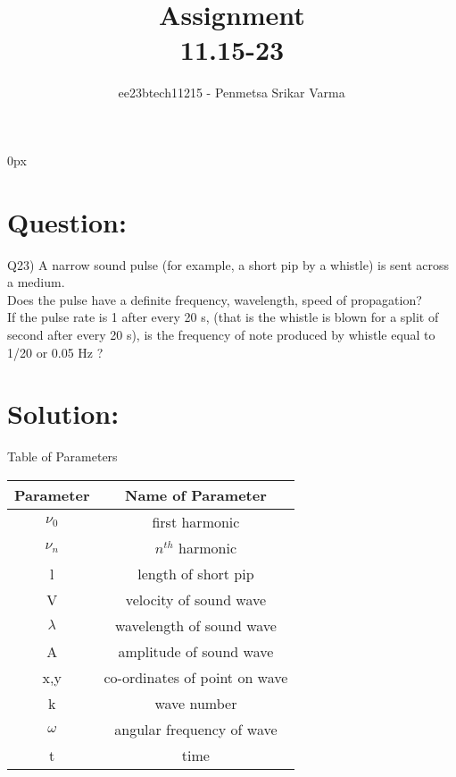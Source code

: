 \documentclass[beamer]{IEEEtran}
\theoremstyle{remark}
\begin{document}
\parindent 0px


\title{Assignment\\[1ex]11.15-23}
\author{ee23btech11215 - Penmetsa Srikar Varma$^{}$%
}
\maketitle
\newpage
\bigskip

\renewcommand{\thefigure}{\theenumi}
\renewcommand{\thetable}{\theenumi}
\section*{Question:}
Q23) A narrow sound pulse (for example, a short pip by a whistle) is sent across a
medium.\\  Does the pulse have a definite  frequency,  wavelength,  speed
of propagation?\\  If the pulse rate is 1 after every 20 s, (that is the whistle is
blown for a split of second after every 20 s), is the frequency of note produced
by whistle equal to 1/20 or 0.05 Hz ?
\section*{Solution:}
{\centering
Table of Parameters\\
}
\begin{table}[h]
    \centering
    \begin{tabular}{|c|c|}
        \hline
         Parameter & Name of Parameter  \\
        \hline
         $\nu_0$ & first harmonic \\
         \hline
          $\nu_n$ & $n^{th}$ harmonic \\
         \hline
         l & length of short pip \\
         \hline
         V & velocity of sound wave\\
         \hline
         $\lambda$ & wavelength of sound wave\\
         \hline
         A & amplitude of sound wave\\
         \hline
         x,y & co-ordinates of point on wave\\
         \hline
         k & wave number\\
         \hline
         $\omega$ & angular frequency of wave\\
         \hline
         t & time\\
         \hline
    \end{tabular}
    \label{tab:t1}
\end{table}
\end{document}
